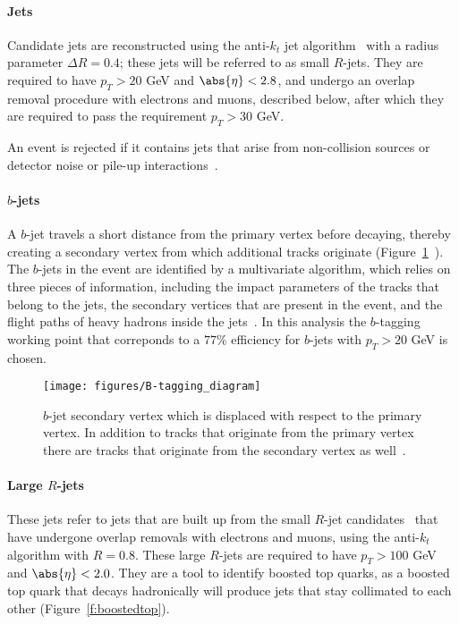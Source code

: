 \paragraph{Jets} Candidate jets are reconstructed using the anti-$k_t$ jet
algorithm~\cite{PERF-2014-07, Cacciari:2008gp, Cacciari:2011ma} with a radius
parameter $\Delta R = 0.4$; these jets will be referred to as small $R$-jets.
They are required to have $p_T > 20$ GeV and $\abs{\eta} < 2.8$, and undergo an
overlap removal procedure with electrons and muons, described below, after
which they are required to pass the requirement $p_T > 30$ GeV.

An event is rejected if it contains jets that arise from non-collision sources
or detector noise or pile-up interactions~\cite{ATLAS-CONF-2015-029}.

\paragraph{$b$-jets} A $b$-jet travels a short distance from the primary vertex
before decaying, thereby creating a secondary vertex from which additional
tracks originate (Figure~\ref{f:btagging}~\cite{bjetwiki}). The $b$-jets in the
event are identified by a multivariate algorithm, which relies on three pieces
of information, including the impact parameters of the tracks that belong to
the jets, the secondary vertices that are present in the event, and the flight
paths of heavy hadrons inside the
jets~\cite{PERF-2012-04,ATL-PHYS-PUB-2016-012}. In this analysis the
$b$-tagging working point that correponds to a $77\%$ efficiency for $b$-jets
with $p_T >20$ GeV is chosen.

\begin{figure}[H]
	\texttt{[image: figures/B-tagging\_diagram]}
	\centering

	\caption{$b$-jet secondary vertex which is displaced with respect to the
		primary vertex. In addition to tracks that originate from the primary vertex
		there are tracks that originate from the secondary vertex as
		well~\cite{bjetwiki}.}

	\label{f:btagging}
\end{figure}


\paragraph{Large $R$-jets} These jets refer to jets that are built up from the
small $R$-jet candidates~\cite{Nachman:2014kla} that have undergone overlap
removals with electrons and muons, using the anti-$k_t$ algorithm with $R=0.8$.
These large $R$-jets are required to have $p_T > 100$ GeV and $\abs{\eta} <
	2.0$. They are a tool to identify boosted top quarks, as a boosted top quark
that decays hadronically will produce jets that stay collimated to each other
(Figure~\ref{f:boostedtop}).


